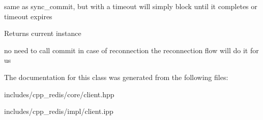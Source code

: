 same as sync\+\_\+commit, but with a timeout will simply block until it completes or timeout expires

\begin{DoxyReturn}{Returns}
current instance 
\end{DoxyReturn}
no need to call commit in case of reconnection the reconnection flow will do it for us 

The documentation for this class was generated from the following files\+:\begin{DoxyCompactItemize}
\item 
includes/cpp\+\_\+redis/core/client.\+hpp\item 
includes/cpp\+\_\+redis/impl/client.\+ipp\end{DoxyCompactItemize}
